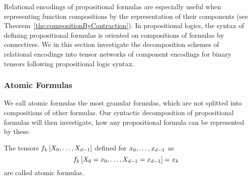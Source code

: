 Relational encodings of propositional formulas are especially useful when representing function compositions by the representation of their components (see Theorem~\ref{the:compositionByContraction}). 
In propositional logics, the syntax of defining propositional formulas is oriented on compositions of formulas by connectives. %
We in this section investigate the decomposition schemes of relational encodings into tensor networks of component encodings for binary tensors following propositional logic syntax.

\subsubsection{Atomic Formulas}

We call atomic formulas the most granular formulas, which are not splitted into compositions of other formulas.
Our syntactic decomposition of propositional formulas will then investigate, how any propositional formula can be represented by these.

\begin{definition}
	The tensors $f_{k}\left[X_{0},\ldots,X_{d-1}\right]$ defined for $x_{0},\ldots,x_{d-1}$ as
		\[ f_{k}\left[X_{0}=x_{0},\ldots,X_{d-1}=x_{d-1}\right] = x_{k} \]
	are called atomic formulas.
\end{definition}

